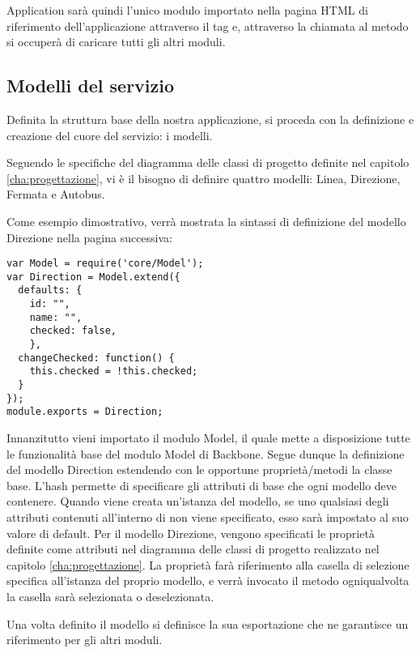 Application sarà quindi l'unico modulo importato nella pagina HTML di riferimento dell'applicazione attraverso il tag  e, attraverso la chiamata al metodo  si occuperà di caricare tutti gli altri moduli.

\subsection{Modelli del servizio} %
\label{sub:modelli_del_servizio}

Definita la struttura base della nostra applicazione, si proceda con la definizione e creazione del cuore del servizio: i modelli.

Seguendo le specifiche del diagramma delle classi di progetto definite nel capitolo \ref{cha:progettazione}, vi è il bisogno di definire quattro modelli: Linea, Direzione, Fermata e Autobus.

Come esempio dimostrativo, verrà mostrata la sintassi di definizione del modello Direzione nella pagina successiva:

\newpage
{\small
\begin{verbatim}
var Model = require('core/Model');
var Direction = Model.extend({
  defaults: {
    id: "",
    name: "",
    checked: false,
    },
  changeChecked: function() {
    this.checked = !this.checked;
  }
});
module.exports = Direction;
\end{verbatim}
}
Innanzitutto vieni importato il modulo Model, il quale mette a disposizione tutte le funzionalità base del modulo Model di Backbone.
Segue dunque la definizione del modello Direction estendendo con le opportune proprietà/metodi la classe base.
L'hash  permette di specificare gli attributi di base che ogni modello deve contenere. Quando viene creata un'istanza del modello, se uno qualsiasi degli attributi contenuti all'interno di  non viene specificato, esso sarà impostato al suo valore di default.
Per il modello Direzione, vengono specificati le proprietà definite come attributi nel diagramma delle classi di progetto realizzato nel capitolo \ref{cha:progettazione}. La proprietà  farà riferimento alla casella di selezione specifica all'istanza del proprio modello, e verrà invocato il metodo  ogniqualvolta la casella sarà selezionata o deselezionata.

Una volta definito il modello si definisce la sua esportazione che ne garantisce un riferimento per gli altri moduli.

